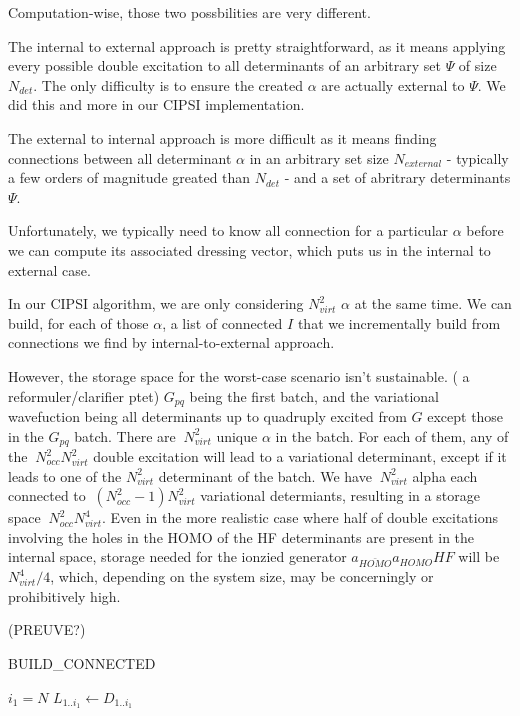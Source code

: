 \documentclass[./thesis.tex]{subfiles}
\begin{document}
Computation-wise, those two possbilities are very different.

The internal to external approach is pretty straightforward, as it means applying every possible double excitation to all determinants of an arbitrary set $\Psi$ of size $N_{det}$. The only difficulty is to ensure the created $\alpha$ are actually external to $\Psi$. We did this and more in our CIPSI implementation.

The external to internal approach is more difficult as it means finding connections between all determinant $\alpha$ in an arbitrary set size $N_{external}$ - typically a few orders of magnitude greated than $N_{det}$ - and a set of abritrary determinants $\Psi$. 

Unfortunately, we typically need to know all connection for a particular $\alpha$ before we can compute its associated dressing vector, which puts us in the internal to external case.

In our CIPSI algorithm, we are only considering $N_{virt}^2$ $\alpha$ at the same time. We can build, for each of those $\alpha$, a list of connected $I$ that we incrementally build from connections we find by internal-to-external approach.


However, the storage space for the worst-case scenario isn't sustainable. ( a reformuler/clarifier ptet)
$G_{pq}$ being the first batch, and the variational wavefuction being all determinants up to quadruply excited from $G$ except those in the $G_{pq}$ batch. There are $~ N_{virt}^2$ unique $\alpha$ in the batch. For each of them, any of the $~N_{occ}^2 N_{virt}^2$ double excitation will lead to a variational determinant, except if it leads to one of the $N_{virt}^2$ determinant of the batch.
We have $~ N_{virt}^2$ alpha each connected to $~(N_{occ}^2-1) N_{virt}^2$ variational determiants, resulting in a storage space $~N_{occ}^2 N_{virt}^4$.
Even in the more realistic case where half of double excitations involving the holes in the HOMO of the HF determinants are present in the internal space, storage needed for the ionzied generator $a_{\bar{HOMO}} a_{HOMO} HF$ will be $N_{virt}^4 / 4$, which, depending on the system size, may be concerningly or prohibitively high. 

(PREUVE?)

\begin{algorithm}
	\label{BUILD_CONNECTED}
	\caption{BUILD\_CONNECTED}
		\KwData{ ---------}
		\KwResult{ ------------}
        $i_1 = N$ \;   
        $L_{1..i_1} \gets D_{1..{i_1}}$ \;
\end{algorithm}
\end{document}
